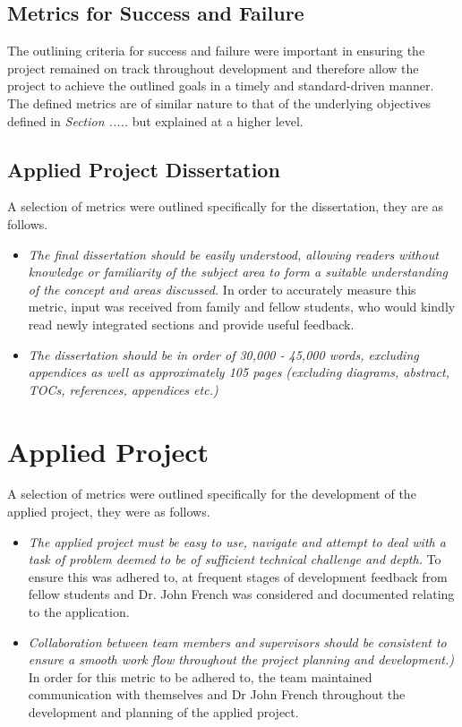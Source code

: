 \subsection{Metrics for Success and Failure}
The outlining criteria for success and failure were important in ensuring the project remained on track throughout development and therefore allow the project to achieve the outlined goals in a timely and standard-driven manner. The defined metrics are of similar nature to that of the underlying objectives defined in \emph{Section .....} but explained at a higher level.

\vspace{5mm} %

\subsection{Applied Project Dissertation}
A selection of metrics were outlined specifically for the dissertation, they are as follows.

\begin{itemize}

    \item \emph{The final dissertation should be easily understood, allowing readers without knowledge or familiarity of the subject area to form a suitable understanding of the concept and areas discussed.} In order to accurately measure this metric, input was received from family and fellow students, who would kindly read newly integrated sections and provide useful feedback.

    \item \emph{The  dissertation should be in order of 30,000 - 45,000 words, excluding appendices as well as approximately 105 pages (excluding diagrams, abstract, TOCs, references, appendices etc.)}
    
\end{itemize}

\section{Applied Project}
A selection of metrics were outlined specifically for the development of the applied project, they were as follows.

\begin{itemize}

    \item \emph{The applied project must be easy to use, navigate and attempt to deal with a task of problem deemed to be of sufficient technical challenge and depth.} To ensure this was adhered to, at frequent stages of development feedback from fellow students and Dr. John French was considered and documented relating to the application.

    \item \emph{Collaboration between team members and supervisors should be consistent to ensure a smooth work flow throughout the project planning and development.)} In order for this metric to be adhered to, the team maintained communication with themselves and Dr John French throughout the development and planning of the applied project.
    
\end{itemize}

